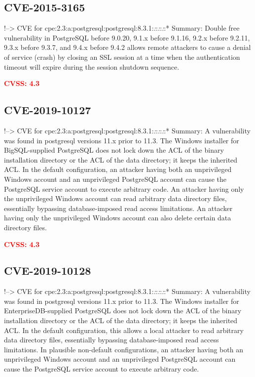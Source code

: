 \documentclass[a4paper, 12pt]{article}
\begin{document}
\hypertarget{cve-2015-3165}{%
\subsection{CVE-2015-3165}\label{cve-2015-3165}}

!--\textgreater{} CVE for
cpe:2.3:a:postgresql:postgresql:8.3.1:\emph{:}:\emph{:}:\emph{:}:*
Summary: Double free vulnerability in PostgreSQL before 9.0.20, 9.1.x
before 9.1.16, 9.2.x before 9.2.11, 9.3.x before 9.3.7, and 9.4.x before
9.4.2 allows remote attackers to cause a denial of service (crash) by
closing an SSL session at a time when the authentication timeout will
expire during the session shutdown sequence.

\textbf{\textcolor{red}{CVSS: 4.3}}

\hypertarget{cve-2019-10127}{%
\subsection{CVE-2019-10127}\label{cve-2019-10127}}

!--\textgreater{} CVE for
cpe:2.3:a:postgresql:postgresql:8.3.1:\emph{:}:\emph{:}:\emph{:}:*
Summary: A vulnerability was found in postgresql versions 11.x prior to
11.3. The Windows installer for BigSQL-supplied PostgreSQL does not lock
down the ACL of the binary installation directory or the ACL of the data
directory; it keeps the inherited ACL. In the default configuration, an
attacker having both an unprivileged Windows account and an unprivileged
PostgreSQL account can cause the PostgreSQL service account to execute
arbitrary code. An attacker having only the unprivileged Windows account
can read arbitrary data directory files, essentially bypassing
database-imposed read access limitations. An attacker having only the
unprivileged Windows account can also delete certain data directory
files.

\textbf{\textcolor{red}{CVSS: 4.3}}

\hypertarget{cve-2019-10128}{%
\subsection{CVE-2019-10128}\label{cve-2019-10128}}

!--\textgreater{} CVE for
cpe:2.3:a:postgresql:postgresql:8.3.1:\emph{:}:\emph{:}:\emph{:}:*
Summary: A vulnerability was found in postgresql versions 11.x prior to
11.3. The Windows installer for EnterpriseDB-supplied PostgreSQL does
not lock down the ACL of the binary installation directory or the ACL of
the data directory; it keeps the inherited ACL. In the default
configuration, this allows a local attacker to read arbitrary data
directory files, essentially bypassing database-imposed read access
limitations. In plausible non-default configurations, an attacker having
both an unprivileged Windows account and an unprivileged PostgreSQL
account can cause the PostgreSQL service account to execute arbitrary
code.
\end{document}
